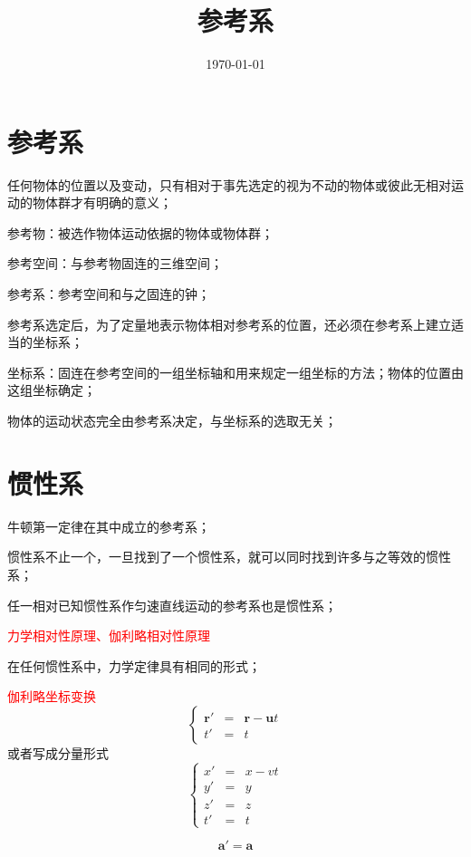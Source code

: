 \documentclass[12pt,a4paper]{article}
\title{参考系}
\author{}
\date{\today}
\renewcommand{\vec}[1]{\boldsymbol{#1}}
\begin{document}
\maketitle

\section{参考系}
任何物体的位置以及变动，只有相对于事先选定的视为不动的物体或彼此无相对运动的物体群才有明确的意义；

参考物：被选作物体运动依据的物体或物体群；

参考空间：与参考物固连的三维空间；

参考系：参考空间和与之固连的钟；

参考系选定后，为了定量地表示物体相对参考系的位置，还必须在参考系上建立适当的坐标系；

坐标系：固连在参考空间的一组坐标轴和用来规定一组坐标的方法；物体的位置由这组坐标确定；

物体的运动状态完全由参考系决定，与坐标系的选取无关；


\section{惯性系}
牛顿第一定律在其中成立的参考系；

惯性系不止一个，一旦找到了一个惯性系，就可以同时找到许多与之等效的惯性系；

任一相对已知惯性系作匀速直线运动的参考系也是惯性系；

\textcolor{red}{力学相对性原理、伽利略相对性原理}

在任何惯性系中，力学定律具有相同的形式；

\textcolor{red}{伽利略坐标变换}
\begin{equation}
\left\{
\begin{aligned}
\vec{r}' &=& \vec{r} -\vec{u}t \\
t' &=& t
\end{aligned} \right.
\end{equation}
或者写成分量形式
\begin{equation}
\left\{
\begin{aligned}
x' &=& x -vt \\
y' &=& y \\
z' &=& z\\
t' &=& t
\end{aligned} \right.
\end{equation}

\begin{equation}
\vec{a}' = \vec{a}
\end{equation}
\end{document}
